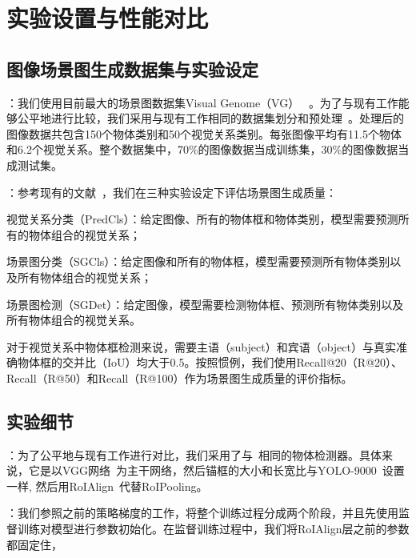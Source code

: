 \section{实验设置与性能对比}
\subsection{图像场景图生成数据集与实验设定}

：我们使用目前最大的场景图数据集Visual Genome（VG） ~\cite{krishna2017visual}。为了与现有工作能够公平地进行比较，我们采用与现有工作相同的数据集划分和预处理~\cite{xu2017scene, zellers2018neural, newell2017pixels, yang2018graph, herzig2018mapping}。处理后的图像数据共包含150个物体类别和50个视觉关系类别。每张图像平均有11.5个物体和6.2个视觉关系。整个数据集中，70\%的图像数据当成训练集，30\%的图像数据当成测试集。


：参考现有的文献~\cite{xu2017scene, zellers2018neural, jae2018tensorize}，我们在三种实验设定下评估场景图生成质量：
\begin{asparaenum}
\item 视觉关系分类（PredCls）：给定图像、所有的物体框和物体类别，模型需要预测所有的物体组合的视觉关系；

\item 场景图分类（SGCls）：给定图像和所有的物体框，模型需要预测所有物体类别以及所有物体组合的视觉关系；

\item 场景图检测（SGDet）：给定图像，模型需要检测物体框、预测所有物体类别以及所有物体组合的视觉关系。
\end{asparaenum}

对于视觉关系中物体框检测来说，需要主语（subject）和宾语（object）与真实准确物体框的交并比（IoU）均大于0.5。按照惯例，我们使用Recall@20（R@20）、Recall（R@50）和Recall（R@100）作为场景图生成质量的评价指标。


\subsection{实验细节}


：为了公平地与现有工作进行对比，我们采用了与~\cite{zellers2018neural}相同的物体检测器。具体来说，它是以VGG网络~\cite{simonyan2015very}为主干网络，然后锚框的大小和长宽比与YOLO-9000~\cite{redmon2017yolo9000}设置一样, 然后用RoIAlign~\cite{he2017mask}代替RoIPooling。


：我们参照之前的策略梯度的工作，将整个训练过程分成两个阶段，并且先使用监督训练对模型进行参数初始化。在监督训练过程中，我们将RoIAlign层之前的参数都固定住，


